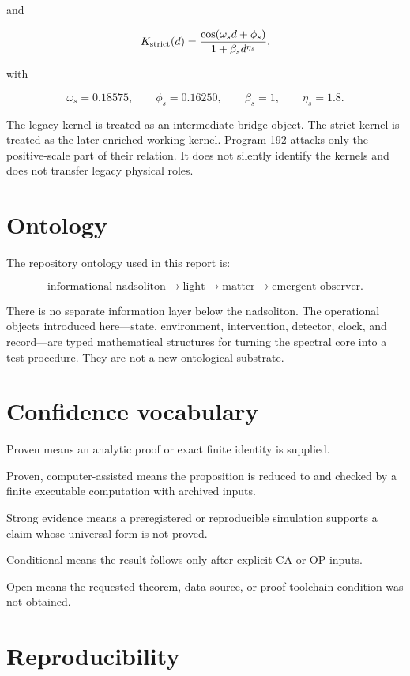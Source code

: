 \documentclass[11pt,a4paper,openany]{report}
\begin{document}
and

\[
K_{\rm strict}(d)=
\frac{\cos(\omega_s d+\phi_s)}
{1+\beta_s d^{\eta_s}},
\]

with

\[
\omega_s=0.18575,
\qquad
\phi_s=0.16250,
\qquad
\beta_s=1,
\qquad
\eta_s=1.8.
\]

The legacy kernel is treated as an intermediate bridge object. The strict kernel is treated as the later enriched working kernel. Program 192 attacks only the positive-scale part of their relation. It does not silently identify the kernels and does not transfer legacy physical roles.

\section{Ontology}

The repository ontology used in this report is:

\[
\text{informational nadsoliton}
\longrightarrow
\text{light}
\longrightarrow
\text{matter}
\longrightarrow
\text{emergent observer}.
\]

There is no separate information layer below the nadsoliton. The operational objects introduced here---state, environment, intervention, detector, clock, and record---are typed mathematical structures for turning the spectral core into a test procedure. They are not a new ontological substrate.

\section{Confidence vocabulary}

Proven means an analytic proof or exact finite identity is supplied.

Proven, computer-assisted means the proposition is reduced to and checked by a finite executable computation with archived inputs.

Strong evidence means a preregistered or reproducible simulation supports a claim whose universal form is not proved.

Conditional means the result follows only after explicit CA or OP inputs.

Open means the requested theorem, data source, or proof-toolchain condition was not obtained.

\section{Reproducibility}
\end{document}

